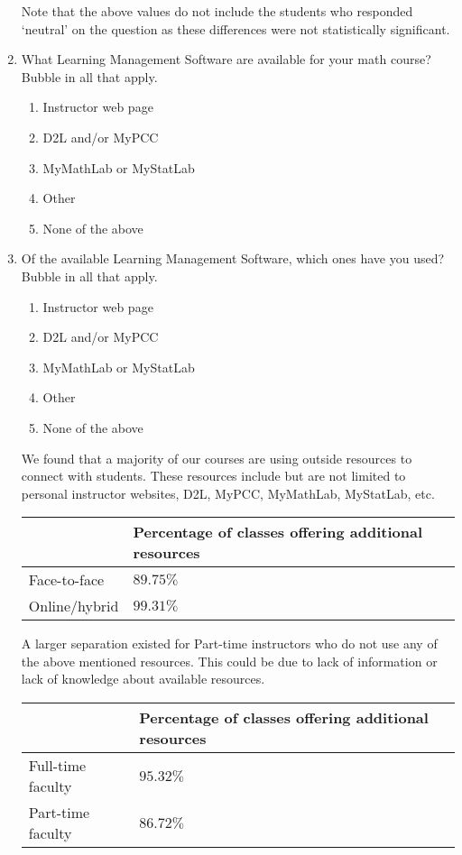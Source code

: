 \begin{enumerate}
	Note that the above values do not include the students who responded `neutral' on the question as these differences were not statistically significant. 
	\item What Learning Management Software are available for your math course? Bubble in all that apply.
	\begin{enumerate}
		\item  Instructor web page
		\item  D2L and/or MyPCC
		\item  MyMathLab or MyStatLab
		\item  Other
		\item  None of the above
	\end{enumerate}
	\item Of the available Learning Management Software, which ones have you used? Bubble in all that apply.
	\begin{enumerate}
		\item  Instructor web page
		\item   D2L and/or MyPCC
		\item   MyMathLab or MyStatLab
		\item   Other
		\item   None of the above
	\end{enumerate}
    We found that a majority of our courses are using outside resources to
    connect with students. These resources include but are not limited to
    personal instructor websites, D2L, MyPCC, MyMathLab, MyStatLab, etc. 
	
	\begin{tabularx}{\linewidth}{lY}
		\toprule
		              & Percentage of classes offering additional resources \\
		\midrule
		Face-to-face  & $89.75\%$                                           \\
		Online/hybrid & $99.31\%$                                           \\
		\bottomrule
	\end{tabularx}
	
	A larger separation existed for Part-time instructors who do not use any of the above mentioned resources. This could be due to lack of information or lack of knowledge about available resources.
	
	\begin{tabularx}{\linewidth}{lY}
		\toprule
		                  & Percentage of classes offering additional resources \\
		\midrule
		Full-time faculty & $95.32\%$                                           \\
		Part-time faculty & $86.72\%$                                           \\
		\bottomrule
	\end{tabularx}
	

\end{enumerate}
